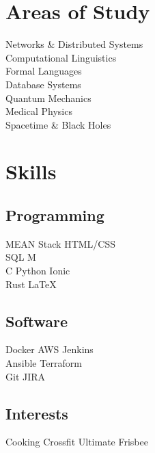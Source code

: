 \documentclass[]{deedy-resume-openfont}
\begin{document}
\begin{minipage}[t]{0.33\textwidth}

\section{Areas of Study}
Networks \& Distributed Systems \\
Computational Linguistics \\
Formal Languages \\
Database Systems \\
Quantum Mechanics \\
Medical Physics \\
Spacetime \& Black Holes \\
\sectionsep


\section{Skills}
\subsection{Programming}
MEAN Stack \textbullet{} HTML/CSS  \\
SQL \textbullet{} M \\
C \textbullet{} Python \textbullet{} Ionic \\
Rust \textbullet{} \LaTeX\
\sectionsep

\subsection{Software}
Docker \textbullet{} AWS \textbullet{} Jenkins \\
Ansible \textbullet{} Terraform \\
Git \textbullet{} JIRA \\
\sectionsep

\subsection{Interests}
Cooking \textbullet{} Crossfit \textbullet{} Ultimate Frisbee
\sectionsep

%
%

\end{minipage}
\end{document}
